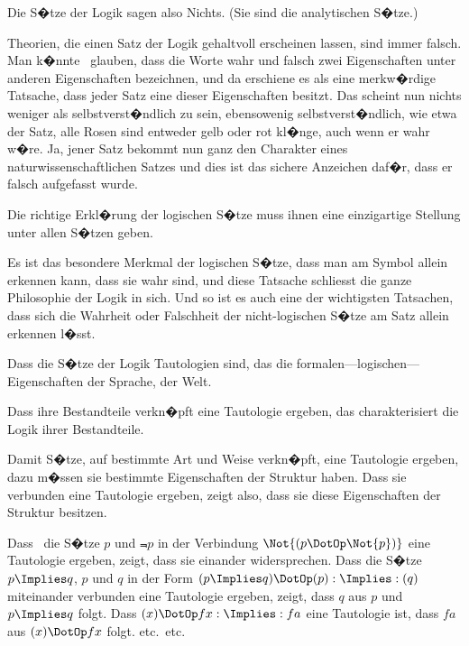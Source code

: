 {Die S�tze der Logik sagen also Nichts. (Sie
sind die analytischen S�tze.)}


{Theorien, die einen Satz der Logik gehaltvoll
erscheinen lassen, sind immer falsch. Man k�nnte
\zumBeispiel\ glauben, dass die Worte \glqq{}wahr\grqq{} und \glqq{}falsch\grqq{}
zwei Eigenschaften unter anderen Eigenschaften
bezeichnen, und da erschiene es als eine merkw�rdige
Tatsache, dass jeder Satz eine dieser
Eigenschaften besitzt. Das scheint nun nichts
weniger als selbstverst�ndlich zu sein, ebensowenig
selbstverst�ndlich, wie etwa der Satz, \glqq{}alle Rosen
sind entweder gelb oder rot\grqq{} kl�nge, auch wenn er
wahr w�re. Ja, jener Satz bekommt nun ganz
den Charakter eines naturwissenschaftlichen Satzes
und dies ist das sichere Anzeichen daf�r, dass er
falsch aufgefasst wurde.}


{Die richtige Erkl�rung der logischen S�tze
muss ihnen eine einzigartige Stellung unter allen
S�tzen geben.}


{Es ist das besondere Merkmal der logischen
S�tze, dass man am Symbol allein erkennen kann,
dass sie wahr sind, und diese Tatsache schliesst
die ganze Philosophie der Logik in sich. Und
so ist es auch eine der wichtigsten Tatsachen, dass
sich die Wahrheit oder Falschheit der nicht-logischen
S�tze  am Satz allein erkennen
l�sst.}


{Dass die S�tze der Logik Tautologien sind,
das  die for\-ma\-len---lo\-gi\-schen---Ei\-gen\-schaf\-ten
der Sprache, der Welt.

Dass ihre Bestandteile  verkn�pft eine Tautologie
ergeben, das charakterisiert die Logik ihrer
Bestandteile.

Damit S�tze, auf bestimmte Art und Weise
verkn�pft, eine Tautologie ergeben, dazu m�ssen
sie bestimmte Eigenschaften der Struktur haben.
Dass sie  verbunden eine Tautologie ergeben,
zeigt also, dass sie diese Eigenschaften der Struktur
besitzen.}


{Dass \zumBeispiel\ die S�tze \glqq{}$p$\grqq{} und \glqq{}$\Not{p}$\grqq{} in der
Verbindung \glqq{}$\Not{(p \DotOp \Not{p})}$\grqq{} eine Tautologie ergeben,
zeigt, dass sie einander widersprechen. Dass
die S�tze \glqq{}$p \Implies q$\grqq{}, \glqq{}$p$\grqq{} und \glqq{}$q$\grqq{} in der Form
\glqq{}$(p \Implies q) \DotOp (p) : \Implies : (q)$\grqq{} miteinander verbunden eine
Tautologie ergeben, zeigt, dass $q$ aus $p$ und $p \Implies q$
folgt. Dass \glqq{}$(x) \DotOp fx : \Implies : fa$\grqq{} eine Tautologie ist,
dass $fa$ aus $(x) \DotOp fx$ folgt.{} etc.\ etc.}


